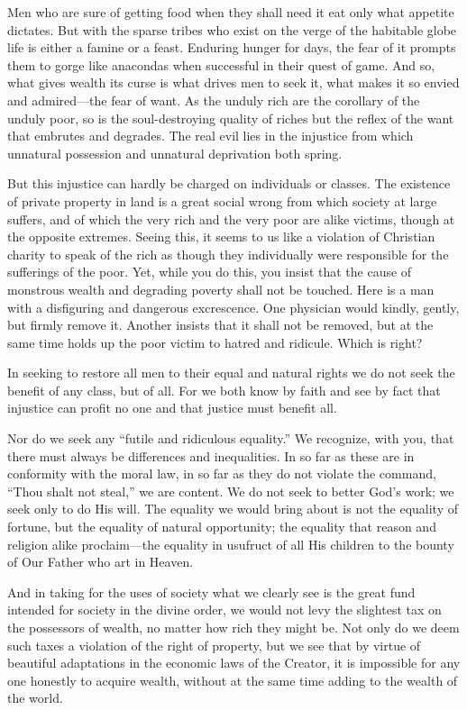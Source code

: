 \documentclass{book}
\begin{document}
Men who are sure of getting food when they shall need it eat only what appetite dictates. But with the sparse tribes who exist on the verge of the habitable globe life is either a famine or a feast. Enduring hunger for days, the fear of it prompts them to gorge like anacondas when successful in their quest of game. And so, what gives wealth its curse is what drives men to seek it, what makes it so envied and admired—the fear of want. As the unduly rich are the corollary of the unduly poor, so is the soul-destroying quality of riches but the reflex of the want that embrutes and degrades. The real evil lies in the injustice from which unnatural possession and unnatural deprivation both spring.

But this injustice can hardly be charged on individuals or classes. The existence of private property in land is a great social wrong from which society at large suffers, and of which the very rich and the very poor are alike victims, though at the opposite extremes. Seeing this, it seems to us like a violation of Christian charity to speak of the rich as though they individually were responsible for the sufferings of the poor. Yet, while you do this, you insist that the cause of monstrous wealth and degrading poverty shall not be touched. Here is a man with a disfiguring and dangerous excrescence. One physician would kindly, gently, but firmly remove it. Another insists that it shall not be removed, but at the same time holds up the poor victim to hatred and ridicule. Which is right?

In seeking to restore all men to their equal and natural rights we do not seek the benefit of any class, but of all. For we both know by faith and see by fact that injustice can profit no one and that justice must benefit all.

Nor do we seek any “futile and ridiculous equality.” We recognize, with you, that there must always be differences and inequalities. In so far as these are in conformity with the moral law, in so far as they do not violate the command, “Thou shalt not steal,” we are content. We do not seek to better God’s work; we seek only to do His will. The equality we would bring about is not the equality of fortune, but the equality of natural opportunity; the equality that reason and religion alike proclaim—the equality in usufruct of all His children to the bounty of Our Father who art in Heaven.

And in taking for the uses of society what we clearly see is the great fund intended for society in the divine order, we would not levy the slightest tax on the possessors of wealth, no matter how rich they might be. Not only do we deem such taxes a violation of the right of property, but we see that by virtue of beautiful adaptations in the economic laws of the Creator, it is impossible for any one honestly to acquire wealth, without at the same time adding to the wealth of the world.
\end{document}
